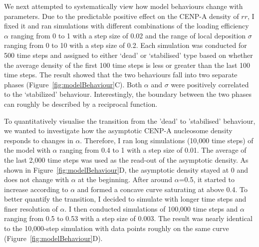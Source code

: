 We next attempted to systematically view how model behaviours change with parameters. Due to the predictable positive effect on the CENP-A density of $rr$, I fixed it and ran simulations with different combinations of the loading efficiency $\alpha$ ranging from 0 to 1 with a step size of 0.02 and the range of local deposition $\sigma$ ranging from 0 to 10 with a step size of 0.2. Each simulation was conducted for 500 time steps and assigned to either ‘dead’ or ‘stabilised’ type based on whether the average density of the first 100 time steps is less or greater than the last 100 time steps. The result showed that the two behaviours fall into two separate phases (Figure~\ref{fig:modelBehaviour}C). Both $\alpha$ and $\sigma$ were positively correlated to the ‘stabilized’ behaviour. Interestingly, the boundary between the two phases can roughly be described by a reciprocal function.

To quantitatively visualise the transition from the 'dead' to 'stabilised' behaviour, we wanted to investigate how the asymptotic CENP-A nucleosome density responds to changes in $\alpha$. Therefore, I ran long simulations (10,000 time steps) of the model with $\alpha$ ranging from 0.4 to 1 with a step size of 0.01. The average of the last 2,000 time steps was used as the read-out of the asymptotic density. As shown in Figure~\ref{fig:modelBehaviour}D, the asymptotic density stayed at 0 and does not change with $\alpha$ at the beginning. After around $\alpha$=0.5, it started to increase according to $\alpha$ and formed a concave curve saturating at above 0.4. To better quantify the transition, I decided to simulate with longer time steps and finer resolution of $\alpha$. I then conducted simulations of 100,000 time steps and $\alpha$ ranging from 0.5 to 0.53 with a step size of 0.003. The result was nearly identical to the 10,000-step simulation with data points roughly on the same curve (Figure~\ref{fig:modelBehaviour}D). 

